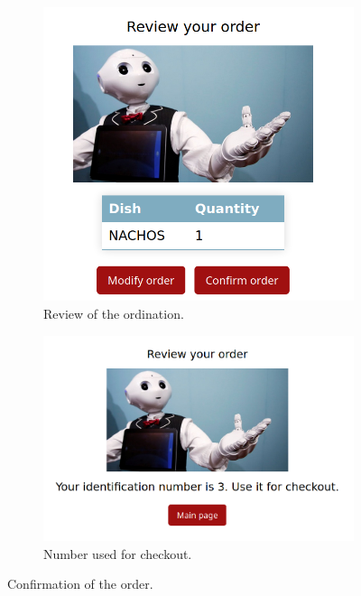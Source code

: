 \documentclass[12pt, letterpaper, twoside]{article}
\begin{document}
\

\begin{figure}[h]
	\centering
	\begin{subfigure}{.5\textwidth}
	  \centering
	  \includegraphics[width=.75\linewidth]{img/review_order.png}
	  \caption{Review of the ordination.}
	  \label{fig:review_order}
	\end{subfigure}%
	\begin{subfigure}{.5\textwidth}
	  \centering
	  \includegraphics[width=1\linewidth]{img/confirmation_order.png}
	  \caption{Number used for checkout.}
	  \label{fig:confirmation_order}
	\end{subfigure}
	\caption{Confirmation of the order.}
	\label{fig:review_confirmation}
\end{figure}
\end{document}
